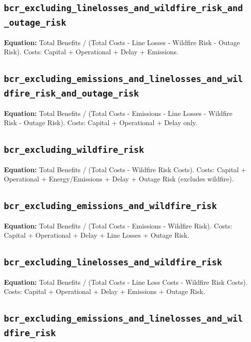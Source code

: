 \documentclass[ctcc_full_documentation.tex]{subfiles}
\begin{document}
\subsection{\texttt{bcr\_excluding\_linelosses\_and\_wildfire\_risk\_and\_outage\_risk}}

\textbf{Equation:} Total Benefits / (Total Costs - Line Losses - Wildfire Risk - Outage Risk). Costs: Capital + Operational + Delay + Emissions.

\subsection{\texttt{bcr\_excluding\_emissions\_and\_linelosses\_and\_wildfire\_risk\_and\_outage\_risk}}

\textbf{Equation:} Total Benefits / (Total Costs - Emissions - Line Losses - Wildfire Risk - Outage Risk). Costs: Capital + Operational + Delay only.

\subsection{\texttt{bcr\_excluding\_wildfire\_risk}}

\textbf{Equation:} Total Benefits / (Total Costs - Wildfire Risk Costs). Costs: Capital + Operational + Energy/Emissions + Delay + Outage Risk (excludes wildfire).

\subsection{\texttt{bcr\_excluding\_emissions\_and\_wildfire\_risk}}

\textbf{Equation:} Total Benefits / (Total Costs - Emissions - Wildfire Risk). Costs: Capital + Operational + Delay + Line Losses + Outage Risk.

\subsection{\texttt{bcr\_excluding\_linelosses\_and\_wildfire\_risk}}

\textbf{Equation:} Total Benefits / (Total Costs - Line Loss Costs - Wildfire Risk Costs). Costs: Capital + Operational + Delay + Emissions + Outage Risk.

\subsection{\texttt{bcr\_excluding\_emissions\_and\_linelosses\_and\_wildfire\_risk}}
\end{document}
